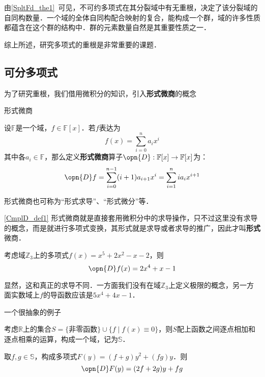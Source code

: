 

由\autoref{SpltFd_the1}~可见，不可约多项式在其分裂域中有无重根，决定了该分裂域的自同构数量．一个域的全体自同构配合映射的复合，能构成一个群，域的许多性质都蕴含在这个群的结构中．群的元素数量自然是其重要性质之一．

综上所述，研究多项式的重根是非常重要的课题．

\subsection{可分多项式}

为了研究重根，我们借用微积分的知识，引入\textbf{形式微商}的概念

\begin{definition}{形式微商}\label{CmplD_def1}

设$\mathbb{F}$是一个域，$f\in\mathbb{F}[x]$．若$f$表达为
\begin{equation}
f(x) = \sum_{i=0}^n a_ix^i
\end{equation}
其中各$a_i\in\mathbb{F}$，那么定义\textbf{形式微商}算子$\opn{D}:\mathbb{F}[x]\to\mathbb{F}[x]$为：
\begin{equation}
\opn{D}f = \sum_{i=0}^{n-1} (i+1)a_{i+1}x^i = \sum_{i=1}^{n} ia_{i}x^{i+1}
\end{equation}

形式微商也可称为“形式求导”、“形式微分”等．

\end{definition}

\autoref{CmplD_def1} 形式微商就是直接套用微积分中的求导操作，只不过这里没有求导的概念，而是就进行多项式变换，其形式就是求导或者求导的推广，因此才叫\textbf{形式}微商．

\begin{example}{}
考虑域$\mathbb{Z}_3$上的多项式$f(x)=x^5+2x^2-x-2$，则
\begin{equation}
\opn{D}f(x) = 2x^4+x-1
\end{equation}

显然，这和真正的求导不同．一方面我们没有在域$\mathbb{Z}_3$上定义极限的概念，另一方面实数域上$f$的导函数应该是$5x^4+4x-1$．
\end{example}

\begin{example}{一个很抽象的例子}

考虑$\mathbb{R}$上的集合$S=\{\text{非零函数}\}\cup\{f\mid f(x)\equiv 0\}$，则$S$配上函数之间逐点相加和逐点相乘的运算，构成一个域，记为$\mathbb{S}$．

取$f, g\in\mathbb{S}$，构成多项式$F(y)=(f+g)y^2+(fg)y$．则
\begin{equation}
\opn{D}F(y) = (2f+2g)y+fg
\end{equation}

\end{example}

